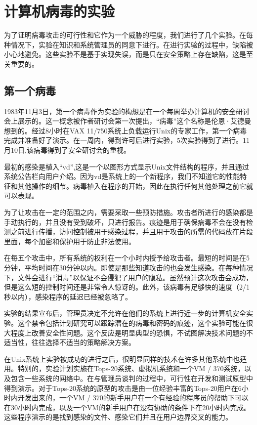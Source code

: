 \chapter{计算机病毒的实验}

为了证明病毒攻击的可行性和它作为一个威胁的程度，我们进行了几个实验。在每种情况下，实验在知识和系统管理员的同意下进行。在进行实验的过程中，缺陷被小心地避免。这些实验不是基于实现失误，而是只在安全策略上存在缺陷，这是至关重要的。

\section{第一个病毒}

1983年11月3日，第一个病毒作为实验的构想是在一个每周举办计算机的安全研讨会上展示的。这一概念被作者研讨会第一次提出，“病毒”这个名称是伦恩·艾德曼想到的。经过8小时在VAX 11/750系统上负载运行Unix的专家工作，第一个病毒完成并准备好了演示。在一周内，得到许可后进行实验，5次实验得到了进行。11月10日,该病毒得到了安全研讨会的重视。

最初的感染是植入“vd”,这是一个以图形方式显示Unix文件结构的程序，并且通过系统公告栏向用户介绍。因为vd是系统上的一个新程序，我们不知道它的性能特征和其他操作的细节。病毒植入在程序的开始，因此在执行任何其他处理之前它就可以表现。


为了让攻击在一定的范围之内，需要采取一些预防措施。攻击者所进行的感染都是手动执行的，并且没有受到破坏，只进行报告。痕迹是用于确保病毒不会在没有检测之前进行传播，访问控制被用于感染过程，并且用于攻击的所需的代码放在片段里面，每个加密和保护用于防止非法使用。


在每五个攻击中，所有系统的权利在一个小时内授予给攻击者。最短的时间是在5分钟，平均时间在30分钟以内。即使是那些知道攻击的也会发生感染。在每种情况下，文件会进行“消毒”以保证不会侵犯了用户的隐私。虽然预计这次攻击会成功，但是这么短的控制时间还是非常令人惊讶的。此外，该病毒有足够快的速度（2/1秒以内），感染程序的延迟已经被忽略了。


实验的结果宣布后，管理员决定不允许在他们的系统上进行近一步的计算机安全实验。这个禁令包括计划研究可以跟踪潜在的病毒和密码的痕迹，这个实验可能在很大程度上改善安全性问题。这个反应是明显典型的恐惧，不试图解决技术问题的不适当性，往往选择不适当的策略解决方案。


在Unix系统上实验被成功的进行之后，很明显同样的技术在许多其他系统中也适用。特别的，实验计划实施在Tops-20系统、虚拟机系统和一个VM / 370系统，以及包含一些系统的网络中。在与管理员谈判的过程中，可行性在开发和测试原型中得到演示。对于Tops-20系统的原型的攻击是由一位经验丰富的Tops-20用户在6小时内开发出来的，一个VM / 370的新手用户在一个有经验的程序员的帮助下可以在30小时内完成，以及一个VM的新手用户在没有协助的条件下在20小时内完成。这些程序演示的是找到感染的文件、感染它们并且在用户边界交叉的能力。


